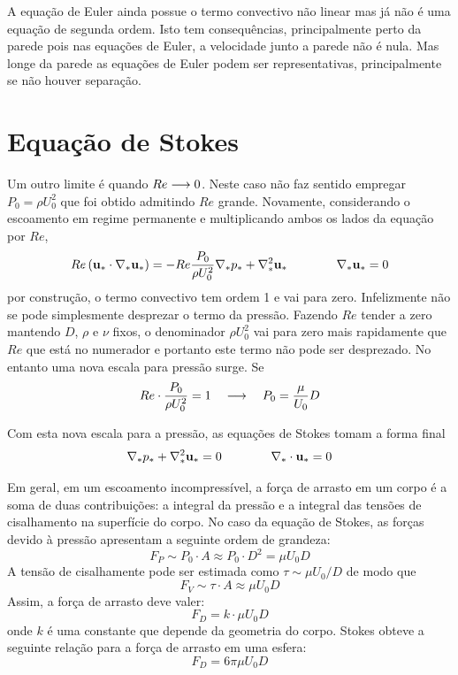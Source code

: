 A equação de Euler ainda possue o termo convectivo não linear mas já não é uma equação de segunda ordem. Isto tem consequências, principalmente perto da parede pois nas equações de Euler, a velocidade junto a parede não é nula. Mas longe da parede as equações de Euler podem ser representativas, principalmente se não houver separação.

\section{Equação de Stokes}
Um outro limite é quando $Re\longrightarrow 0$. Neste caso não faz sentido empregar $P_0 = \rho U_0^2$ que foi obtido admitindo $Re$ grande. Novamente, considerando o escoamento em regime permanente e multiplicando ambos os lados da equação por $Re$, 
\[
Re\left( \mathbf{u}_*\cdot\nabla_* \mathbf{u_*}\right) = -Re\frac{P_0}{\rho U_0^2}\nabla_* p_* + \nabla_*^2 \mathbf{u}_* \qquad\qquad \nabla_* \mathbf{u}_* = 0
\]
por construção, o termo convectivo tem ordem 1 e  vai para zero. Infelizmente não se pode simplesmente desprezar o termo da pressão. Fazendo $Re$ tender a zero mantendo $D$, $\rho$ e $\nu$ fixos, o denominador $\rho U_0^2$ vai para zero mais rapidamente que $Re$ que está no numerador e portanto este termo não pode ser desprezado. No entanto uma nova escala para pressão surge. Se
\[
Re\cdot\frac{P_0}{\rho U_0^2} = 1 \quad\longrightarrow\quad P_0 = \frac{\mu}{U_0}{D}
\]

Com esta nova escala para a pressão, as equações de Stokes tomam a forma final
\begin{equation}
\nabla_* p_* + \nabla_*^2 \mathbf{u}_* = 0 \qquad\qquad \nabla_*\cdot \mathbf{u}_* = 0
\label{eq:stokes}
\end{equation}

Em geral, em um escoamento incompressível, a força de arrasto em um corpo é a soma de duas contribuições: a integral da pressão e a integral das tensões de cisalhamento na superfície do corpo. No caso da equação de Stokes, as forças devido à pressão apresentam a seguinte ordem de grandeza:
\[
F_P \sim P_0 \cdot A \approx P_0 \cdot D^2 =\mu U_0 D
\]
A tensão de cisalhamente pode ser estimada como $\tau \sim \mu U_0 / D$ de modo que 
\[
F_V \sim \tau \cdot A \approx \mu U_0 D
\]
Assim, a força de arrasto deve valer:
\[
F_D = k \cdot \mu U_0 D
\]
onde $k$ é uma constante que depende da geometria do corpo. Stokes obteve a seguinte relação para a força de arrasto em uma esfera:
\begin{equation}
F_D = 6\pi\mu U_0 D
\label{eq:cdstokes}
\end{equation}

